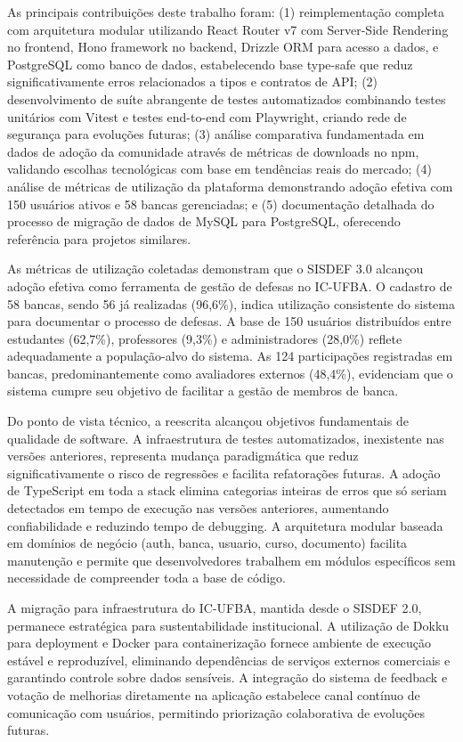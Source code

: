 \documentclass[nonacm, sigconf]{acmart}
\begin{document}
As principais contribuições deste trabalho foram: (1) reimplementação completa com arquitetura modular utilizando React Router v7 com Server-Side Rendering no frontend, Hono framework no backend, Drizzle ORM para acesso a dados, e PostgreSQL como banco de dados, estabelecendo base type-safe que reduz significativamente erros relacionados a tipos e contratos de API; (2) desenvolvimento de suíte abrangente de testes automatizados combinando testes unitários com Vitest e testes end-to-end com Playwright, criando rede de segurança para evoluções futuras; (3) análise comparativa fundamentada em dados de adoção da comunidade através de métricas de downloads no npm, validando escolhas tecnológicas com base em tendências reais do mercado; (4) análise de métricas de utilização da plataforma demonstrando adoção efetiva com 150 usuários ativos e 58 bancas gerenciadas; e (5) documentação detalhada do processo de migração de dados de MySQL para PostgreSQL, oferecendo referência para projetos similares.

As métricas de utilização coletadas demonstram que o SISDEF 3.0 alcançou adoção efetiva como ferramenta de gestão de defesas no IC-UFBA. O cadastro de 58 bancas, sendo 56 já realizadas (96,6\%), indica utilização consistente do sistema para documentar o processo de defesas. A base de 150 usuários distribuídos entre estudantes (62,7\%), professores (9,3\%) e administradores (28,0\%) reflete adequadamente a população-alvo do sistema. As 124 participações registradas em bancas, predominantemente como avaliadores externos (48,4\%), evidenciam que o sistema cumpre seu objetivo de facilitar a gestão de membros de banca.

Do ponto de vista técnico, a reescrita alcançou objetivos fundamentais de qualidade de software. A infraestrutura de testes automatizados, inexistente nas versões anteriores, representa mudança paradigmática que reduz significativamente o risco de regressões e facilita refatorações futuras. A adoção de TypeScript em toda a stack elimina categorias inteiras de erros que só seriam detectados em tempo de execução nas versões anteriores, aumentando confiabilidade e reduzindo tempo de debugging. A arquitetura modular baseada em domínios de negócio (auth, banca, usuario, curso, documento) facilita manutenção e permite que desenvolvedores trabalhem em módulos específicos sem necessidade de compreender toda a base de código.

A migração para infraestrutura do IC-UFBA, mantida desde o SISDEF 2.0, permanece estratégica para sustentabilidade institucional. A utilização de Dokku para deployment e Docker para containerização fornece ambiente de execução estável e reproduzível, eliminando dependências de serviços externos comerciais e garantindo controle sobre dados sensíveis. A integração do sistema de feedback e votação de melhorias diretamente na aplicação estabelece canal contínuo de comunicação com usuários, permitindo priorização colaborativa de evoluções futuras.
\end{document}
